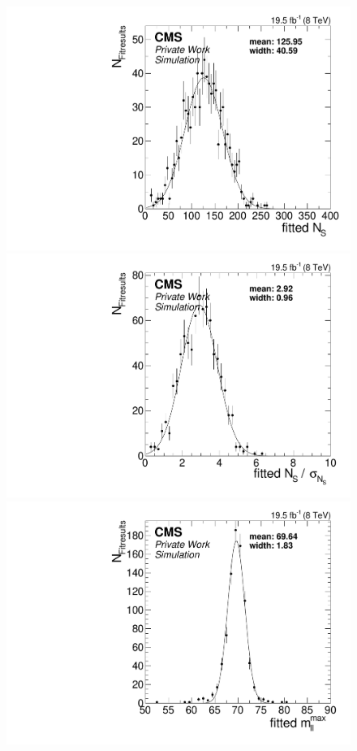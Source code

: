 \begin{figure}[hbp]
  \centering
  \begin{minipage}[t]{0.49\textwidth}
    \includegraphics[width=\textwidth]{plots/results/fit/nSPure_signalInjected.pdf}
  \end{minipage}
  \begin{minipage}[t]{0.49\textwidth}
    \includegraphics[width=\textwidth]{plots/results/fit/nS_signalInjected.pdf}
  \end{minipage}
  \begin{minipage}[t]{0.49\textwidth}
    \includegraphics[width=\textwidth]{plots/results/fit/m0_signalInjected.pdf}

\end{minipage}
\end{figure}
